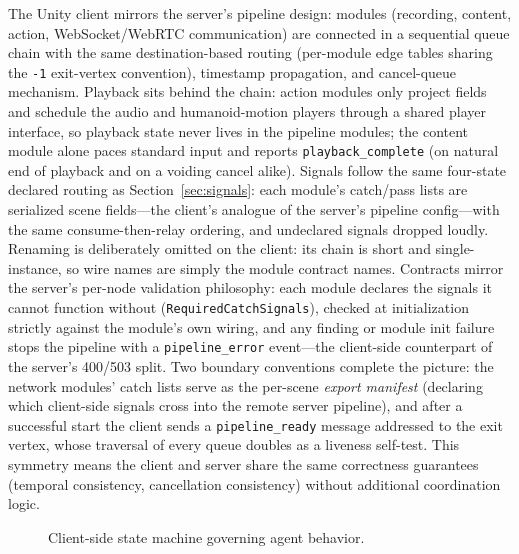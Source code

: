 \documentclass[11pt,a4paper]{article}
\begin{document}
The Unity client mirrors the server's pipeline design: modules (recording, content, action, WebSocket/WebRTC communication) are connected in a sequential queue chain with the same destination-based routing (per-module edge tables sharing the \texttt{-1} exit-vertex convention), timestamp propagation, and cancel-queue mechanism. Playback sits behind the chain: action modules only project fields and schedule the audio and humanoid-motion players through a shared player interface, so playback state never lives in the pipeline modules; the content module alone paces standard input and reports \texttt{playback\_complete} (on natural end of playback and on a voiding cancel alike). Signals follow the same four-state declared routing as Section~\ref{sec:signals}: each module's catch/pass lists are serialized scene fields---the client's analogue of the server's pipeline config---with the same consume-then-relay ordering, and undeclared signals dropped loudly. Renaming is deliberately omitted on the client: its chain is short and single-instance, so wire names are simply the module contract names. Contracts mirror the server's per-node validation philosophy: each module declares the signals it cannot function without (\texttt{RequiredCatchSignals}), checked at initialization strictly against the module's own wiring, and any finding or module init failure stops the pipeline with a \texttt{pipeline\_error} event---the client-side counterpart of the server's 400/503 split. Two boundary conventions complete the picture: the network modules' catch lists serve as the per-scene \emph{export manifest} (declaring which client-side signals cross into the remote server pipeline), and after a successful start the client sends a \texttt{pipeline\_ready} message addressed to the exit vertex, whose traversal of every queue doubles as a liveness self-test. This symmetry means the client and server share the same correctness guarantees (temporal consistency, cancellation consistency) without additional coordination logic.

\begin{figure}[h]
    \centering
    \caption{Client-side state machine governing agent behavior.}
    \label{fig:state_machine}
\end{figure}
\end{document}
